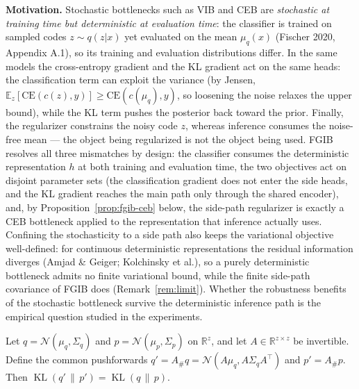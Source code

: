 \textbf{Motivation.}
Stochastic bottlenecks such as VIB and CEB are \emph{stochastic at training time but
deterministic at evaluation time}: the classifier is trained on sampled codes $z \sim q(z|x)$
yet evaluated on the mean $\mu_q(x)$ (Fischer 2020, Appendix A.1), so its training and
evaluation distributions differ. In the same models the cross-entropy gradient and the KL
gradient act on the same heads: the classification term can exploit the variance (by Jensen,
$\mathbb{E}_z[\mathrm{CE}(c(z), y)] \ge \mathrm{CE}(c(\mu_q), y)$, so loosening the noise
relaxes the upper bound), while the KL term pushes the posterior back toward the prior.
Finally, the regularizer constrains the noisy code $z$, whereas inference consumes the
noise-free mean --- the object being regularized is not the object being used.
FGIB resolves all three mismatches by design: the classifier consumes the deterministic
representation $h$ at both training and evaluation time, the two objectives act on disjoint
parameter sets (the classification gradient does not enter the side heads, and the KL
gradient reaches the main path only through the shared encoder), and, by
Proposition~\ref{prop:fgib-ceb} below, the side-path regularizer is exactly a CEB bottleneck
applied to the representation that inference actually uses. Confining the stochasticity to a
side path also keeps the variational objective well-defined: for continuous deterministic
representations the residual information diverges (Amjad \& Geiger; Kolchinsky et al.),
so a purely deterministic bottleneck admits no finite variational bound, while the finite
side-path covariance of FGIB does (Remark~\ref{rem:limit}). Whether the robustness benefits
of the stochastic bottleneck survive the deterministic inference path is the empirical
question studied in the experiments.

\begin{lemma}\label{lem:kl-invariance}
Let $q = \mathcal{N}(\mu_q, \Sigma_q)$ and $p = \mathcal{N}(\mu_p, \Sigma_p)$ on $\mathbb{R}^{z}$,
and let $A \in \mathbb{R}^{z \times z}$ be invertible. Define the common pushforwards
$q' = A_\# q = \mathcal{N}(A\mu_q, A\Sigma_q A^\top)$ and $p' = A_\# p$. Then
$\operatorname{KL}(q'\,\|\,p') = \operatorname{KL}(q\,\|\,p)$.
\end{lemma}

